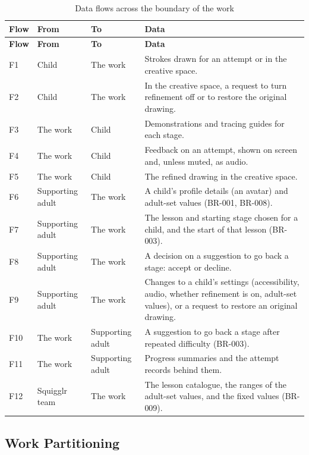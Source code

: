 \documentclass[12pt]{article}
\renewcommand{\_}{\textunderscore\allowbreak}%
\begin{document}
{\footnotesize
\begin{longtable}{@{}
  >{\raggedright\arraybackslash}p{}
  >{\raggedright\arraybackslash}p{}
  >{\raggedright\arraybackslash}p{}
  >{\raggedright\arraybackslash}p{}@{}}
\caption{Data flows across the boundary of the work}
\label{tab:work-flows}\\
\toprule
\textbf{Flow} & \textbf{From} & \textbf{To} & \textbf{Data} \\
\midrule
\endfirsthead
\toprule
\textbf{Flow} & \textbf{From} & \textbf{To} & \textbf{Data} \\
\midrule
\endhead
\bottomrule
\endlastfoot
F1 & Child & The work & Strokes drawn for an attempt or in the creative space.
\\
F2 & Child & The work & In the creative space, a request to turn refinement off
or to restore the original drawing. \\
F3 & The work & Child & Demonstrations and tracing guides for each stage. \\
F4 & The work & Child & Feedback on an attempt, shown on screen and, unless
muted, as audio. \\
F5 & The work & Child & The refined drawing in the creative space. \\
F6 & Supporting adult & The work & A child's profile details (an avatar) and
adult-set values (BR-001, BR-008). \\
F7 & Supporting adult & The work & The lesson and starting stage chosen for a
child, and the start of that lesson (BR-003). \\
F8 & Supporting adult & The work & A decision on a suggestion to go back a
stage: accept or decline. \\
F9 & Supporting adult & The work & Changes to a child's settings (accessibility,
audio, whether refinement is on, adult-set values), or a request to restore an
original drawing. \\
F10 & The work & Supporting adult & A suggestion to go back a stage after
repeated difficulty (BR-003). \\
F11 & The work & Supporting adult & Progress summaries and the attempt records
behind them. \\
F12 & Squigglr team & The work & The lesson catalogue, the ranges of the
adult-set values, and the fixed values (BR-009). \\
\end{longtable}
}

\subsection{Work Partitioning}
\label{sec:work-partitioning}
\end{document}
